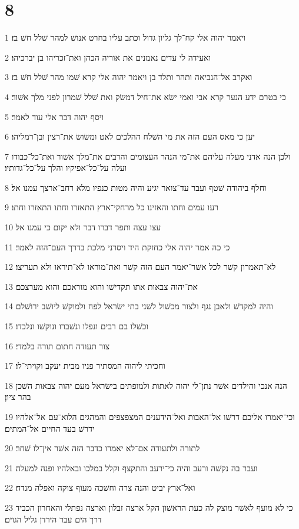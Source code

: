 \chapter{8}

\par 1 ויאמר יהוה אלי קח־לך גליון גדול וכתב עליו בחרט אנושׁ למהר שׁלל חשׁ בז׃
\par 2 ואעידה לי עדים נאמנים את אוריה הכהן ואת־זכריהו בן יברכיהו׃
\par 3 ואקרב אל־הנביאה ותהר ותלד בן ויאמר יהוה אלי קרא שׁמו מהר שׁלל חשׁ בז׃
\par 4 כי בטרם ידע הנער קרא אבי ואמי ישׂא את־חיל דמשׂק ואת שׁלל שׁמרון לפני מלך אשׁור׃
\par 5 ויסף יהוה דבר אלי עוד לאמר׃
\par 6 יען כי מאס העם הזה את מי השׁלח ההלכים לאט ומשׂושׂ את־רצין ובן־רמליהו׃
\par 7 ולכן הנה אדני מעלה עליהם את־מי הנהר העצומים והרבים את־מלך אשׁור ואת־כל־כבודו ועלה על־כל־אפיקיו והלך על־כל־גדותיו׃
\par 8 וחלף ביהודה שׁטף ועבר עד־צואר יגיע והיה מטות כנפיו מלא רחב־ארצך עמנו אל׃
\par 9 רעו עמים וחתו והאזינו כל מרחקי־ארץ התאזרו וחתו התאזרו וחתו׃
\par 10 עצו עצה ותפר דברו דבר ולא יקום כי עמנו אל׃
\par 11 כי כה אמר יהוה אלי כחזקת היד ויסרני מלכת בדרך העם־הזה לאמר׃
\par 12 לא־תאמרון קשׁר לכל אשׁר־יאמר העם הזה קשׁר ואת־מוראו לא־תיראו ולא תעריצו׃
\par 13 את־יהוה צבאות אתו תקדישׁו והוא מוראכם והוא מערצכם׃
\par 14 והיה למקדשׁ ולאבן נגף ולצור מכשׁול לשׁני בתי ישׂראל לפח ולמוקשׁ ליושׁב ירושׁלם׃
\par 15 וכשׁלו בם רבים ונפלו ונשׁברו ונוקשׁו ונלכדו׃
\par 16 צור תעודה חתום תורה בלמדי׃
\par 17 וחכיתי ליהוה המסתיר פניו מבית יעקב וקויתי־לו׃
\par 18 הנה אנכי והילדים אשׁר נתן־לי יהוה לאתות ולמופתים בישׂראל מעם יהוה צבאות השׁכן בהר ציון׃
\par 19 וכי־יאמרו אליכם דרשׁו אל־האבות ואל־הידענים המצפצפים והמהגים הלוא־עם אל־אלהיו ידרשׁ בעד החיים אל־המתים׃
\par 20 לתורה ולתעודה אם־לא יאמרו כדבר הזה אשׁר אין־לו שׁחר׃
\par 21 ועבר בה נקשׁה ורעב והיה כי־ירעב והתקצף וקלל במלכו ובאלהיו ופנה למעלה׃
\par 22 ואל־ארץ יביט והנה צרה וחשׁכה מעוף צוקה ואפלה מנדח׃
\par 23 כי לא מועף לאשׁר מוצק לה כעת הראשׁון הקל ארצה זבלון וארצה נפתלי והאחרון הכביד דרך הים עבר הירדן גליל הגוים׃


